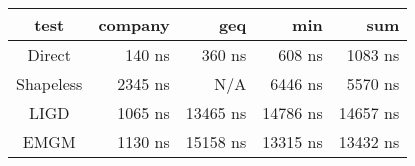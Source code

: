 \begin{tabular}{c|r|r|r|r}
\bf{test}  & \bf{company}    & \bf{geq}        & \bf{min}        & \bf{sum}       \\
\hline
Direct     &          140 ns &          360 ns &          608 ns &         1083 ns\\
Shapeless  &         2345 ns &             N/A &         6446 ns &         5570 ns\\
LIGD       &         1065 ns &        13465 ns &        14786 ns &        14657 ns\\
EMGM       &         1130 ns &        15158 ns &        13315 ns &        13432 ns\\
\end{tabular}
